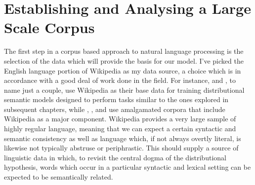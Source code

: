 \section{Establishing and Analysing a Large Scale Corpus} \label{sec:pmi}
The first step in a corpus based approach to natural language processing is the selection of the data which will provide the basis for our model.  I've picked the English language portion of Wikipedia as my data source, a choice which is in accordance with a good deal of work done in the field.  For instance, \cite{GabrilovichEA2007} and \cite{CollobertEA2008}, to name just a couple, use Wikipedia as their base data for training distributional semantic models designed to perform tasks similar to the ones explored in subsequent chapters, while \cite{BaroniEA2014}, \cite{PenningtonEA2014}, and \cite{GutierrezEA2016} use amalgamated corpora that include Wikipedia as a major component.  Wikipedia provides a very large sample of highly regular language, meaning that we can expect a certain syntactic and semantic consistency as well as language which, if not always overtly literal, is likewise not typically abstruse or periphrastic.  This should supply a source of linguistic data in which, to revisit the central dogma of the distributional hypothesis, words which occur in a particular syntactic and lexical setting can be expected to be semantically related.

